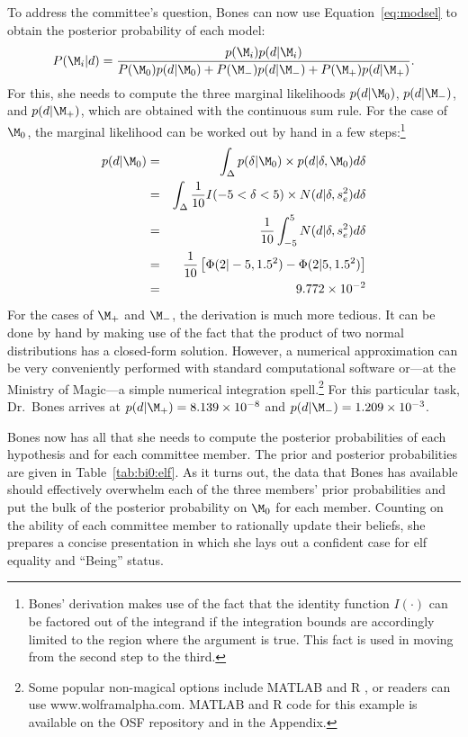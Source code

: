 To address the committee's question, Bones can now use Equation~\ref{eq:modsel} to obtain the posterior probability of each model:
$$P(\M_i|d) = \frac{p(\M_i)p(d|\M_i)}{P(\M_0)p(d|\M_0) + P(\M_-)p(d|\M_-) + P(\M_+)p(d|\M_+)}.$$
For this, she needs to compute the three marginal likelihoods $p(d|\M_0)$, $p(d|\M_-)$, and $p(d|\M_+)$, which are obtained with the continuous sum rule. For the case of $\M_0$, the marginal likelihood can be worked out by hand in a few steps:\footnote{Bones' derivation makes use of the fact that the identity function $I(\cdot)$ can be factored out of the integrand if the integration bounds are accordingly limited to the region where the argument is true. This fact is used in moving from the second step to the third.}
\begin{eqnarray*}
p(d|\M_0) 
&=& \int_\Delta p(\delta|\M_0)\times p(d|\delta,\M_0) d\delta\\
&=& \int_\Delta\frac{1}{10}I(-5<\delta<5) \times N(d|\delta,s_e^2)  d\delta\\
&=& \frac{1}{10} \int_{-5}^{5} N(d|\delta,s_e^2) d\delta\\
&=& \frac{1}{10} \left[ \Phi(2|-5,1.5^2) - \Phi(2|5,1.5^2) \right]\\ 
&=& 9.772 \times 10^{-2}
\end{eqnarray*}
For the cases of $\M_+$ and $\M_-$, the derivation is much more tedious. It can be done by hand by making use of the fact that the product of two normal distributions has a closed-form solution. However, a numerical approximation can be very conveniently performed with standard computational software or---at the Ministry of Magic---a simple numerical integration spell.\footnote{Some popular non-magical options include MATLAB \protect\cite{MATLAB} and R \cite{R}, or readers can use www.wolframalpha.com. MATLAB and R code for this example is available on the OSF repository and in the Appendix.} For this particular task, Dr.\ Bones arrives at $p(d|\M_+) = 8.139 \times 10^{-8}$ and $p(d|\M_-) = 1.209 \times 10^{-3}$.

Bones now has all that she needs to compute the posterior probabilities of each hypothesis and for each committee member. The prior and posterior probabilities are given in Table~\ref{tab:bi0:elf}. As it turns out, the data that Bones has available should effectively overwhelm each of the three members' prior probabilities and put the bulk of the posterior probability on $\M_0$ for each member. Counting on the ability of each committee member to rationally update their beliefs, she prepares a concise presentation in which she lays out a confident case for elf equality and ``Being'' status.
\newcommand{\p}{\phantom{0}}

